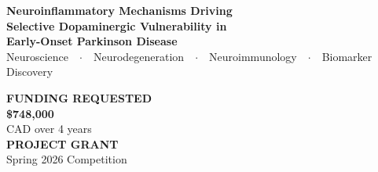 \documentclass[11pt,letterpaper]{article}
\begin{document}
\setcounter{page}{1}

\begin{tcolorbox}[
  enhanced,
  colback=cihrNavy,
  colframe=cihrNavy,
  sharp corners,
  left=10pt, right=10pt, top=10pt, bottom=10pt,
  parbox=false
]
  \begin{minipage}[c]{0.72\linewidth}
    {\fontsize{14}{17}\selectfont\bfseries\color{white}
    Neuroinflammatory Mechanisms Driving\\
    Selective Dopaminergic Vulnerability in\\
    Early-Onset Parkinson Disease}\\[6pt]
    {\fontsize{9}{11}\selectfont\color{cihrGold}
    \faTag\enspace
    Neuroscience\ \ $\cdot$\ \
    Neurodegeneration\ \ $\cdot$\ \
    Neuroimmunology\ \ $\cdot$\ \
    Biomarker Discovery}
  \end{minipage}%
  \hfill
  \begin{minipage}[c]{0.25\linewidth}
    \begin{tcolorbox}[
      enhanced,
      colback=cihrRed,
      colframe=cihrRed,
      sharp corners,
      left=5pt, right=5pt, top=5pt, bottom=5pt,
      parbox=false
    ]
      \centering
      {\fontsize{7}{9}\selectfont\color{white}\textbf{FUNDING REQUESTED}}\\[3pt]
      {\fontsize{15}{18}\selectfont\bfseries\color{white}\$748,000}\\[2pt]
      {\fontsize{7}{9}\selectfont\color{white}CAD over 4 years}\\[5pt]
      {\fontsize{7}{9}\selectfont\color{cihrGold}\textbf{PROJECT GRANT}}\\
      {\fontsize{7}{9}\selectfont\color{white}Spring 2026 Competition}
    \end{tcolorbox}
  \end{minipage}
\end{tcolorbox}

\vspace{6pt}
\end{document}
